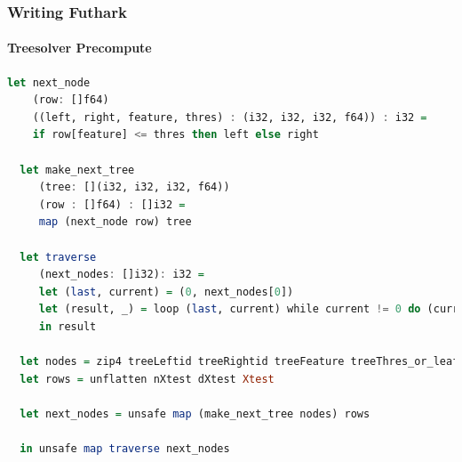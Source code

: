 \documentclass[12pt,t]{beamer}
\begin{document}
\begin{frame}[fragile]
  \frametitle{Writing Futhark}
  \framesubtitle{Treesolver Precompute}
  \begin{minipage}{\textwidth}
  \begin{lstlisting}[language=Haskell, breaklines]
  let next_node
    (row: []f64)
    ((left, right, feature, thres) : (i32, i32, i32, f64)) : i32 =
    if row[feature] <= thres then left else right

  let make_next_tree
     (tree: [](i32, i32, i32, f64))
     (row : []f64) : []i32 =
     map (next_node row) tree

  let traverse
     (next_nodes: []i32): i32 =
     let (last, current) = (0, next_nodes[0])
     let (result, _) = loop (last, current) while current != 0 do (current, next_nodes[current])
     in result

  let nodes = zip4 treeLeftid treeRightid treeFeature treeThres_or_leaf
  let rows = unflatten nXtest dXtest Xtest

  let next_nodes = unsafe map (make_next_tree nodes) rows

  in unsafe map traverse next_nodes


\end{lstlisting}
\end{minipage}
\end{frame}
\end{document}
